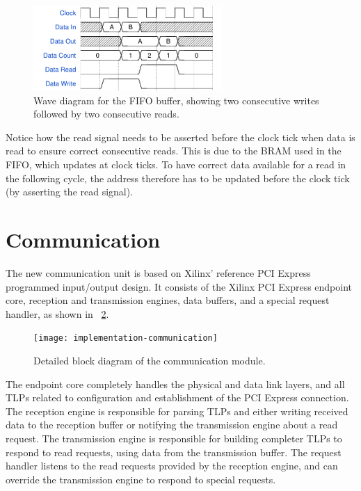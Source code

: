 \begin{figure}[!ht]
    \centering
    \includegraphics[width=0.64\textwidth]{figures/wavediagram-fifo}
    \caption[FIFO buffer wave diagram]{
        Wave diagram for the FIFO buffer, showing two consecutive writes followed by two consecutive reads.
    }
    \label{fig:wavediagram-fifo}
\end{figure}

Notice how the read signal needs to be asserted before the clock tick when data is read to ensure correct consecutive reads.
This is due to the BRAM used in the FIFO, which updates at clock ticks.
To have correct data available for a read in the following cycle, the address therefore has to be updated before the clock tick (by asserting the read signal).


\section{Communication}

The new communication unit is based on Xilinx' reference PCI Express programmed input/output design.
It consists of the Xilinx PCI Express endpoint core, reception and transmission engines, data buffers, and a special request handler, as shown in \figurename~\ref{fig:implementation-communication}.

\begin{figure}[!ht]
    \centering
    \texttt{[image: implementation-communication]}
    \caption[Communication module]{
        Detailed block diagram of the communication module.
    }
    \label{fig:implementation-communication}
\end{figure}

The endpoint core completely handles the physical and data link layers, and all TLPs related to configuration and establishment of the PCI Express connection.
The reception engine is responsible for parsing TLPs and either writing received data to the reception buffer or notifying the transmission engine about a read request.
The transmission engine is responsible for building completer TLPs to respond to read requests, using data from the transmission buffer.
The request handler listens to the read requests provided by the reception engine, and can override the transmission engine to respond to special requests.

